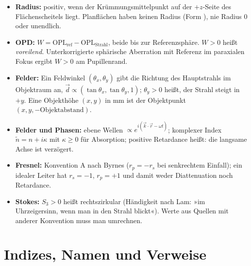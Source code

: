 \documentclass[11pt,a4paper,openany]{book}
\DeclareRobustCommand{\code}[1]{\texttt{\directlua{rttcode("\luaescapestring{\detokenize{#1}}")}}}
\begin{document}
\begin{itemize}
  \item \textbf{Radius:} positiv, wenn der Krümmungsmittelpunkt auf der $+z$-Seite des
        Flächenscheitels liegt. Planflächen haben keinen Radius (Form \code{plane}), nie
        Radius 0 oder unendlich.
  \item \textbf{OPD:} $W = \text{OPL}_\text{ref} - \text{OPL}_\text{Strahl}$, beide bis zur
        Referenzsphäre. $W>0$ heißt \emph{voreilend}. Unterkorrigierte sphärische Aberration
        mit Referenz im paraxialen Fokus ergibt $W>0$ am Pupillenrand.
  \item \textbf{Felder:} Ein Feldwinkel $(\theta_x, \theta_y)$ gibt die Richtung des
        Hauptstrahls im Objektraum an, $\vec d \propto (\tan\theta_x, \tan\theta_y, 1)$;
        $\theta_y>0$ heißt, der Strahl steigt in $+y$. Eine Objekthöhe $(x,y)$ in mm ist der
        Objektpunkt $(x, y, -\text{Objektabstand})$.
  \item \textbf{Felder und Phasen:} ebene Wellen $\propto e^{i(\vec k\cdot\vec r - \omega t)}$;
        komplexer Index $\tilde n = n + i\kappa$ mit $\kappa\ge 0$ für Absorption; positive
        Retardance heißt: die langsame Achse ist verzögert.
  \item \textbf{Fresnel:} Konvention A nach Byrnes ($r_p = -r_s$ bei senkrechtem Einfall); ein
        idealer Leiter hat $r_s=-1$, $r_p=+1$ und damit weder Diattenuation noch Retardance.
  \item \textbf{Stokes:} $S_3 > 0$ heißt rechtszirkular (Händigkeit nach Lam: »im
        Uhrzeigersinn, wenn man in den Strahl blickt«). Werte aus Quellen mit anderer
        Konvention muss man umrechnen.
\end{itemize}

\section{Indizes, Namen und Verweise}
\end{document}
